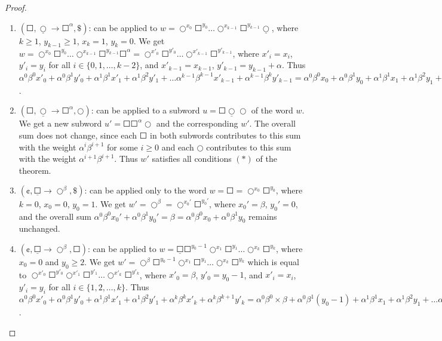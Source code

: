 \begin{proof}
\begin{enumerate}
\item $(\Square, \underline{\Circle} \to \Square^{\alpha}, \$)$:
can be applied to $w = \Circle^{x_0} \Square^{y_0} \ldots \Circle^{x_{k-1}} \Square^{y_{k-1}} \underline{\Circle}$, where $k \ge 1$,  $y_{k-1} \ge 1$, $x_k = 1$, $y_k = 0$. We get $w = \Circle^{x_0} \Square^{y_0} \ldots \Circle^{x_{k-1}} \Square^{y_{k-1}} \Square^{\alpha} = \Circle^{x'_0} \Square^{y'_0} \ldots \Circle^{x'_{k-1}} \Square^{y'_{k-1}}$, where $x'_i = x_i$, $y'_i = y_i$ for all $i \in \{0, 1, \ldots, k-2\}$, and $x'_{k-1} = x_{k-1}$, $y'_{k-1} = y_{k-1} + \alpha$. Thus $\alpha^0 \beta^0 x'_0 + \alpha^0 \beta^1 y'_0 + \alpha^1 \beta^1 x'_1 + \alpha^1 \beta^2 y'_1 + \ldots \alpha^{k-1} \beta^{k-1} x'_{k-1} + \alpha^{k-1} \beta^k y'_{k-1} = \alpha^0 \beta^0 x_0 +  \alpha^0 \beta^1 y_0 + \alpha^1 \beta^1 x_1 + \alpha^1 \beta^2y_1 + \ldots \alpha^{k-1} \beta^{k-1} x_{k-1} + \alpha^{k-1} \beta^k (y_{k-1} + \alpha) = \alpha^0 \beta^0 x_0 + \alpha^0 \beta^1 y_0 + \ldots \alpha^{k-1} \beta^{k-1} x_{k-1} + \alpha^{k-1} \beta^k y_{k-1} + \alpha^k \beta^k x_k + \alpha^k \beta^{k+1} y_k = (\alpha \beta)^l m$.

\item $(\Square, \underline{\Circle} \to \Square^{\alpha}, \Circle)$:
can be applied to a subword $u = \Square \underline{\Circle} \Circle$ of the word $w$. We get a new subword $u' = \Square \Square^{\alpha} \Circle$ and the corresponding $w'$. The overall sum does not change, since each $\Square$ in both subwords contributes to this sum with the weight $\alpha^i \beta^{i+1}$ for some $i \ge 0$ and each $\Circle$ contributes to this sum with the weight $\alpha^{i+1} \beta^{i+1}$. Thus $w'$ satisfies all conditions $(*)$ of the theorem.

\item $(\cent, \underline{\Square} \to \Circle^{\beta}, \$)$:
can be applied only to the word $w = \Square = \Circle^{x_0} \Square^{y_0}$, where $k = 0$, $x_0 = 0$, $y_0 = 1$. We get $w' = \Circle^{\beta} = \Circle^{x_0'} \Square^{y_0'}$, where $x_0' = \beta$, $y_0' = 0$, and the overall sum $\alpha^0 \beta^0 x_0' + \alpha^0 \beta^1 y_0' = \beta = \alpha^0 \beta^0 x_0 + \alpha^0 \beta^1 y_0$ remains unchanged.

\item $(\cent, \underline{\Square} \to \Circle^{\beta}, \Square)$:
can be applied to $w = \underline{\Square} \Square^{y_0 - 1} \Circle^{x_1} \Square^{y_1} \ldots \Circle^{x_k} \Square^{y_k}$, where $x_0 = 0$ and $y_0 \ge 2$. We get $w' = \Circle^{\beta} \Square^{y_0 - 1} \Circle^{x_1} \Square^{y_1} \ldots \Circle^{x_k} \Square^{y_k}$ which is equal to $\Circle^{x'_0} \Square^{y'_0} \Circle^{x'_1} \Square^{y'_1} \ldots \Circle^{x'_k} \Square^{y'_k}$, where $x'_0 = \beta$, $y'_0 = y_0 - 1$, and $x'_i = x_i$, $y'_i = y_i$ for all $i \in \{1, 2, \ldots, k\}$. Thus $\alpha^0 \beta^0 x'_0 + \alpha^0 \beta^1 y'_0 + \alpha^1 \beta^1 x'_1 + \alpha^1 \beta^2 y'_1 + \alpha^k \beta^k x'_k + \alpha^k \beta^{k+1} y'_k = \alpha^0 \beta^0 \times \beta + \alpha^0 \beta^1 (y_0 - 1) + \alpha^1 \beta^1 x_1 + \alpha^1 \beta^2 y_1 + \ldots \alpha^k \beta^k x_k + \alpha^k \beta^{k+1} y_k = (\alpha \beta)^l m$.


\end{enumerate}
\end{proof}
